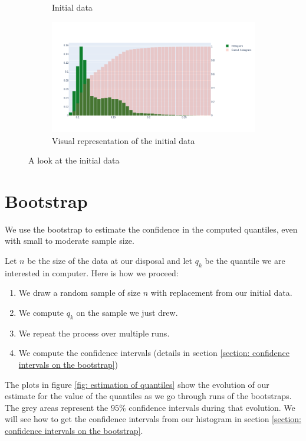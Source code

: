 \documentclass{article}
\begin{document}
\begin{figure}[H]
\begin{subfigure}{.25\textwidth}
        \caption{Initial data}
        \label{fig: initial data}
    \end{subfigure}
    \hfill
    \begin{subfigure}{.74\textwidth}
        \centering
        \includegraphics[width=\textwidth]{images/plot_excel_data.png}
        \caption{Visual representation of the initial data}
        \label{fig: visual representation of the initial data}
    \end{subfigure}
    \caption{A look at the initial data}
\end{figure}

\section{Bootstrap}
\label{section: bootstrap}
We use the bootstrap to estimate the confidence in the computed quantiles, even with small to moderate sample size.

Let \(n\) be the size of the data at our disposal and let \(q_k\) be the quantile we are interested in computer. Here is how we proceed:
\begin{enumerate}
    \item We draw a random sample of size \(n\) with replacement from our initial data.
    \item We compute \(q_k\) on the sample we just drew.
    \item We repeat the process over multiple runs.
    \item We compute the confidence intervals (details in section \ref{section: confidence intervals on the bootstrap})
\end{enumerate}

The plots in figure \ref{fig: estimation of quantiles} show the evolution of our estimate for the value of the quantiles as we go through runs of the bootstraps. The grey areas represent the $95\%$ confidence intervals during that evolution. We will see how to get the confidence intervals from our histogram in section \ref{section: confidence intervals on the bootstrap}.
\end{document}
